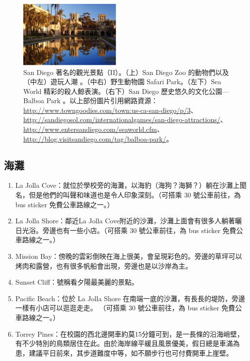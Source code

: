 \documentclass[10pt,a4paper]{book}
\begin{document}
\begin{CJK}{UTF8}{bkai}
\begin{figure}[H]
\includegraphics[width=0.45\textwidth]{Pics/balboa_park}
\caption{San Diego 著名的觀光景點（II）。（上）San Diego Zoo 的動物們以及（中左）遊玩人潮 。（中右）野生動物園 Safari Park。（左下）Sea World 精彩的殺人鯨表演。（右下）San Diego 歷史悠久的文化公園---Balboa Park 。以上部份圖片引用網路資源：\url{http://www.towngoodies.com/town:us-ca-san-diego/p/3}、\url{http://sandiegosol.com/internationalgames/san-diego-attractions/}、\url{http://www.entersandiego.com/seaworld.cfm}、\url{http://blog.visitsandiego.com/tag/balboa-park/}。}
\end{figure}

\subsection{海灘} 
\begin{enumerate}
\item La Jolla Cove：就位於學校旁的海灘，以海豹（海狗？海獅？）躺在沙灘上聞名，但是他們的叫聲和味道也是令人印象深刻。（可搭乘 30 號公車前往，為 bus sticker 免費公車路線之一。）

\item La Jolla Shore：鄰近La Jolla Cove附近的沙灘，沙灘上面會有很多人躺著曬日光浴。旁邊也有一些小店。（可搭乘 30 號公車前往，為 bus sticker 免費公車路線之一。）

\item Mission Bay：傍晚的雲彩倒映在海上很美，會呈現彩色的。旁邊的草坪可以烤肉和露營，也有很多帆船會出現，旁邊也是以沙岸為主。

\item Sunset Cliff：號稱看夕陽最美麗的景點。

\item Pacific Beach：位於 La Jolla Shore 在南端一底的沙灘，有長長的堤防，旁邊一樣有小店可以逛逛走走。 （可搭乘 30 號公車前往，為 bus sticker 免費公車路線之一。）

\item Torrey Pines：在校園的西北邊開車約莫15分鐘可到，是一長條的沿海峭壁，有不少特別的鳥類居住在此。由於海岸線平緩且風景優美，假日總是車滿為患，建議平日前來，其步道難度中等，如不願步行也可付費開車上崖壁。


\end{enumerate}
\end{CJK}
\end{document}

